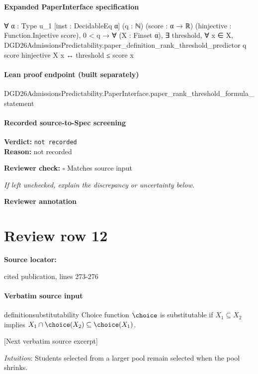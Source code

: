 \documentclass[10pt]{article}
\newcommand{\reviewerbox}{%
  \par\noindent\fbox{\parbox{0.96\linewidth}{\rule{0pt}{0.38in}}}\par
}
\newcommand{\reviewmatch}[1]{%
  \par\noindent\textbf{Reviewer check:} $\square$\; #1\par
  \noindent\emph{If left unchecked, explain the discrepancy or uncertainty below.}\par
}
\begin{document}
\paragraph{Expanded PaperInterface specification}
\begin{ReviewVerbatim}
∀ {α : Type u_1} [inst : DecidableEq α] (q : ℕ) (score : α → ℝ) (hinjective : Function.Injective score),
  0 < q →
    ∀ (X : Finset α),
      ∃ threshold,
        ∀ x ∈ X,
          DGD26AdmissionsPredictability.paper_definition_rank_threshold_predictor q score hinjective X x ↔
            threshold ≤ score x
\end{ReviewVerbatim}

\paragraph{Lean proof endpoint (built separately)}\begin{ReviewVerbatim}
DGD26AdmissionsPredictability.PaperInterface.paper_rank_threshold_formula_statement
\end{ReviewVerbatim}

\paragraph{Recorded source-to-Spec screening}
\textbf{Verdict:} \texttt{not recorded}
\\
\textbf{Reason:} not recorded
\reviewmatch{Matches source input}
\noindent\textbf{Reviewer annotation}\par
\reviewerbox
\clearpage
\hypertarget{source-claim-d17644eda5ebe53f}{}
\section*{Review row 12}
\textbf{Source locator:} {\footnotesize\raggedright cited publication, lines 273-\allowbreak{}276\par}
\paragraph{Verbatim source input}
\begin{ReviewVerbatim}
\begin{restatable}[Substitutability]{definition}{substitutability}
\label{def:substitutability}
Choice function $\choice$ is substitutable if $X_1 \subseteq X_2$ implies $X_1 \cap \choice(X_2) \subseteq \choice(X_1)$.
\end{restatable}

[Next verbatim source excerpt]


\substitutability*
\textit{Intuition}: Students selected from a larger pool remain selected when the pool shrinks.
\end{ReviewVerbatim}
\end{document}
